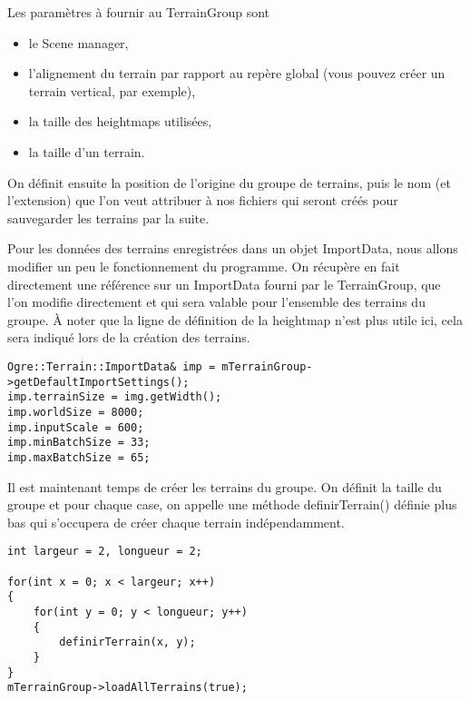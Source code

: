 Les param\`etres \`a fournir au TerrainGroup sont
\begin{itemize}
\item le Scene manager,
\item l'alignement du terrain par rapport au rep\`ere global (vous pouvez cr\'eer un terrain vertical, par exemple),
\item la taille des heightmaps utilis\'ees, 
\item la taille d'un terrain.
\end{itemize}

On d\'efinit ensuite la position de l'origine du groupe de terrains, puis le nom (et l'extension) que l'on veut attribuer \`a nos fichiers qui seront cr\'e\'es pour sauvegarder les terrains par la suite.

Pour les donn\'ees des terrains enregistr\'ees dans un objet ImportData, nous allons modifier un peu le fonctionnement du programme. On r\'ecup\`ere en fait directement une r\'ef\'erence sur un ImportData fourni par le TerrainGroup, que l'on modifie directement et qui sera valable pour l'ensemble des terrains du groupe. \`A noter que la ligne de d\'efinition de la heightmap n'est plus utile ici, cela sera indiqu\'e lors de la cr\'eation des terrains.

\begin{lstlisting}[caption={}]
Ogre::Terrain::ImportData& imp = mTerrainGroup->getDefaultImportSettings();
imp.terrainSize = img.getWidth();
imp.worldSize = 8000;
imp.inputScale = 600;
imp.minBatchSize = 33;
imp.maxBatchSize = 65;
\end{lstlisting}

Il est maintenant temps de cr\'eer les terrains du groupe. On d\'efinit la taille du groupe et pour chaque case, on appelle une m\'ethode definirTerrain() d\'efinie plus bas qui s'occupera de cr\'eer chaque terrain ind\'ependamment.

\begin{lstlisting}[caption={Cr\'eation des terrains du groupe}]
int largeur = 2, longueur = 2;

for(int x = 0; x < largeur; x++)
{
    for(int y = 0; y < longueur; y++)
    {
        definirTerrain(x, y);
    }
}
mTerrainGroup->loadAllTerrains(true);
\end{lstlisting}

